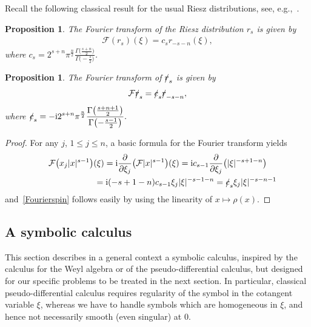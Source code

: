 \documentclass[10pt,a4paper]{amsart}
\newcommand{\fsl}[1]{{\slashed{#1}}} %
\numberwithin{equation}{section}
\newtheorem{prop}[theor]{Proposition}
\begin{document}
Recall the following classical result for the usual Riesz distributions, see, e.g.,~\cite{gs}.
\begin{prop}
The Fourier transform of the Riesz distribution $r_s$ is given by
\begin{gather*}
\mathcal F (r_s) (\xi) = c_s r_{-s-n}(\xi) ,
\end{gather*}
where $\displaystyle c_s= 2^{s+n} \pi^{\frac{n}{2}} \frac{\Gamma\big(\frac{s+n}{2}\big)}{\Gamma\big({-}\frac{s}{2}\big)}$.
\end{prop}


\begin{prop} The Fourier transform of $\fsl{r}_s$ is given by
\begin{gather}\label{Fourierspin}
\mathcal F \fsl{r}_s = \fsl{c}_s \fsl{r}_{-s-n},
\end{gather}
where
$
\displaystyle\fsl{c}_s= -{\rm i}2^{s+n}\pi^{\frac{n}{2}} \frac{\Gamma\big(\frac{s+n+1}{2}\big)}{\Gamma\big({-}\frac{s-1}{2}\big)} .
$
\end{prop}
\begin{proof}
For any $j$, $1\leq j\leq n$, a basic formula for the Fourier transform yields
\begin{gather*}
\mathcal F\big(x_j \vert x\vert^{s-1}\big)(\xi) = {\rm i}\frac{\partial}{\partial \xi_j} \big(\mathcal F \vert x\vert^{s-1}\big)(\xi)
= {\rm i} c_{s-1} \frac{\partial}{\partial \xi_j} \big(\vert \xi\vert^{-s+1-n}\big)
\\ \hphantom{\mathcal F\big(x_j \vert x\vert^{s-1}\big)(\xi)}
{}= {\rm i}(-s+1-n) c_{s-1} \xi_j\vert \xi\vert^{-s-1-n}= \fsl{c}_s \xi_j \vert \xi\vert^{-s-n-1}
\end{gather*}
and~\eqref{Fourierspin} follows easily by using the linearity of $x\mapsto \rho(x)$.
\end{proof}

\subsection{A symbolic calculus}\label{S43}
This section describes in a general context a symbolic calculus, inspired by the calculus for the Weyl algebra or of the pseudo-differential calculus, but designed for our specific problems to be treated in the next section. In particular, classical pseudo-differential calculus requires regularity of the symbol in the cotangent variable $\xi$, whereas we have to handle symbols which are homogeneous in $\xi$, and hence not necessarily smooth (even singular) at $0$.
\end{document}
